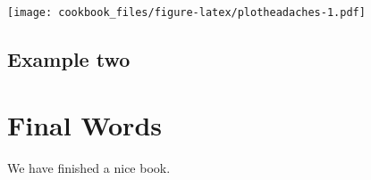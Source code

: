\documentclass[
]{book}
\begin{document}
\texttt{[image: cookbook\_files/figure-latex/plotheadaches-1.pdf]}

\hypertarget{example-two}{%
\section{Example two}\label{example-two}}

\hypertarget{final-words}{%
\chapter{Final Words}\label{final-words}}

We have finished a nice book.

  
\end{document}
